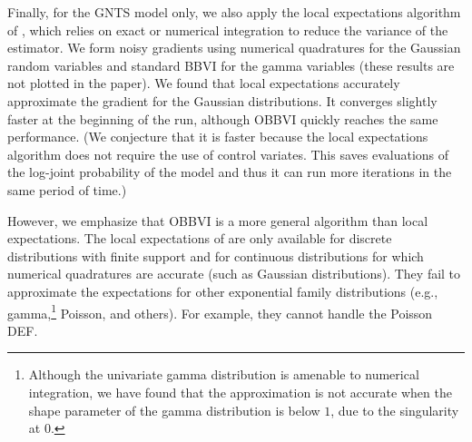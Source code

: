 Finally, for the \gls{GNTS} model only, we also apply the local
expectations algorithm of \citet{Titsias2015}, which relies on exact
or numerical integration to reduce the variance of the estimator. We
form noisy gradients using numerical quadratures for the Gaussian random
variables and standard \gls{BBVI} for the gamma variables (these results
are not plotted in the paper). We found that local expectations
accurately approximate the gradient for the Gaussian distributions.
It converges slightly faster at the beginning of the run, although
\gls{OBBVI} quickly reaches the same performance. (We conjecture
that it is faster because the local expectations algorithm does not
require the use of control variates. This saves evaluations of
the log-joint probability of the model and thus it can run more
iterations in the same period of time.)

However, we emphasize that \gls{OBBVI} is a more general
algorithm than local expectations. The local expectations of
\citet{Titsias2015} are only available for discrete distributions with
finite support and for continuous distributions for which numerical
quadratures are accurate (such as Gaussian distributions). They fail
to approximate the expectations for other exponential family
distributions (e.g., gamma,\footnote{Although
  the univariate gamma distribution is amenable to numerical
  integration, we have found that the approximation
  is not accurate when the shape parameter of the gamma
  distribution is below $1$, due to the singularity at $0$.} Poisson,
and others). For example, they cannot handle the Poisson \gls{DEF}.


